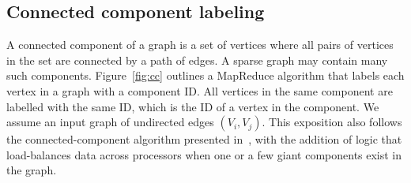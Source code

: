 \subsection{Connected component labeling}

A connected component of a graph is a set of vertices where all pairs
of vertices in the set are connected by a path of edges.  A sparse
graph may contain many such components.  Figure~\ref{fig:cc} outlines
a MapReduce algorithm that labels each vertex in a graph with a
component ID.  All vertices in the same component are labelled with
the same ID, which is the ID of a vertex in the component.  We assume
an input graph of undirected edges $(V_i,V_j)$.  This exposition also
follows the connected-component algorithm presented in~\cite{Cohen09},
with the addition of logic that load-balances data across processors
when one or a few giant components exist in the graph.

